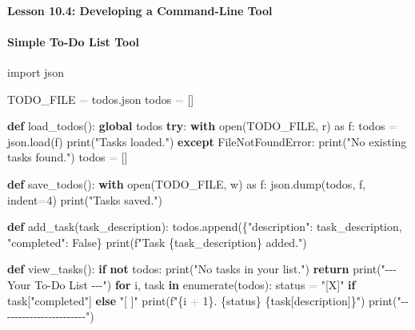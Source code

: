 \documentclass[
  justified,
  openright,
]{tufte-book}
\let\subsection\paragraph
\let\paragraph\paragraph
\newcommand{\KeywordTok}[1]{\textcolor{CodeKeyword}{\textbf{#1}}}  %
\newcommand{\StringTok}[1]{\textcolor{CodeString}{#1}}              %
\newcommand{\CodeNumTok}[1]{\textcolor{CodeNumber}{#1}}             %
\newcommand{\CodeAccentTok}[1]{\textcolor{CodeAccent}{#1}}          %
\newcommand{\OperatorTok}[1]{\textcolor{DarkGray}{#1}}              %
\newenvironment{Shaded}{%
  \begin{mdframed}[style=TufteCode]%
}{%
  \end{mdframed}%
}
\let\subsection\paragraph
\let\paragraph\paragraph
\begin{document}
\subsection{Lesson 10.4: Developing a Command-Line
Tool}\label{lesson-10.4-developing-a-command-line-tool}

\subsection{Simple To-Do List Tool}\label{simple-to-do-list-tool}

\begin{Shaded}
\begin{Highlighting}[]
\CodeAccentTok{import} json
 
TODO\_FILE \OperatorTok{=} \StringTok{\textquotesingle{}todos.json\textquotesingle{}}
todos \OperatorTok{=} []
 
 
\KeywordTok{def} load\_todos():
    \KeywordTok{global} todos
    \KeywordTok{try}:
        \KeywordTok{with} open(TODO\_FILE, \StringTok{\textquotesingle{}r\textquotesingle{}}) \CodeAccentTok{as} f:
            todos \OperatorTok{=} json.load(f)
        print(\StringTok{"Tasks loaded."})
    \KeywordTok{except} \CodeAccentTok{FileNotFoundError}:
        print(\StringTok{"No existing tasks found."})
        todos \OperatorTok{=} []
 
 
\KeywordTok{def} save\_todos():
    \KeywordTok{with} open(TODO\_FILE, \StringTok{\textquotesingle{}w\textquotesingle{}}) \CodeAccentTok{as} f:
        json.dump(todos, f, indent\OperatorTok{=}\CodeNumTok{4})
    print(\StringTok{"Tasks saved."})
 
 
\KeywordTok{def} add\_task(task\_description):
    todos.append(\{\StringTok{"description"}: task\_description, \StringTok{"completed"}: False\}
    print(\StringTok{f"Task \textquotesingle{}}\StringTok{\{}task\_description\StringTok{\}}\StringTok{\textquotesingle{} added."})
 
 
\KeywordTok{def} view\_tasks():
    \KeywordTok{if} \KeywordTok{not} todos:
        print(\StringTok{"No tasks in your list."})
        \KeywordTok{return}
    print(\StringTok{"{-}{-}{-} Your To{-}Do List {-}{-}{-}"})
    \KeywordTok{for} i, task \KeywordTok{in} enumerate(todos):
        status \OperatorTok{=} \StringTok{"[X]"} \KeywordTok{if} task[\StringTok{"completed"}] \KeywordTok{else} \StringTok{"[ ]"}
        print(\StringTok{f"}\StringTok{\{}i \OperatorTok{+} \CodeNumTok{1}\StringTok{\}}\StringTok{. }\StringTok{\{}status\StringTok{\}}\StringTok{ }\StringTok{\{}task[\StringTok{\textquotesingle{}description\textquotesingle{}}]\StringTok{\}}\StringTok{"})
    print(\StringTok{"{-}{-}{-}{-}{-}{-}{-}{-}{-}{-}{-}{-}{-}{-}{-}{-}{-}{-}{-}{-}{-}{-}{-}"})
 

\end{Highlighting}
\end{Shaded}
\end{document}
